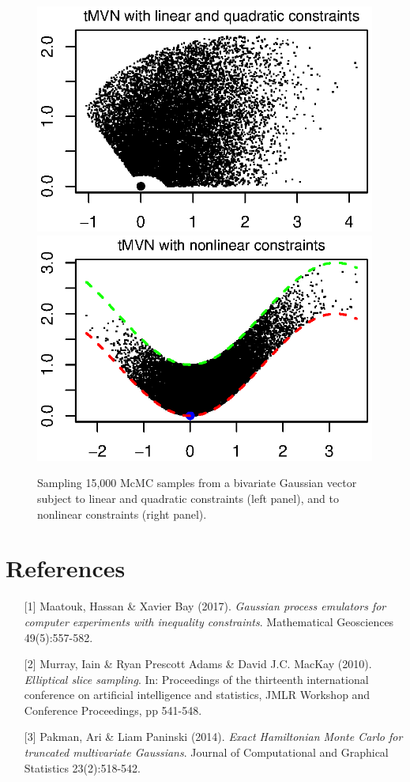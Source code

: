 \begin{talk}
\begin{figure}[ht]
\centering
\includegraphics[scale=0.76]{Photos/tmvn_linear_quadratic_constr}
\includegraphics[scale=0.76]{Photos/tmvn_nonlinear_constr}
\caption{Sampling 15,000 McMC samples from a bivariate Gaussian vector subject to linear and quadratic constraints (left panel), and to nonlinear constraints (right panel).}
\label{fig:tmvn}
\end{figure}





\section*{References}
\begin{enumerate}
	\item[{[1]}] Maatouk, Hassan \& Xavier Bay (2017). {\it Gaussian process emulators for computer experiments with inequality constraints}. Mathematical Geosciences 49(5):557-582.
	\item[{[2]}] Murray, Iain \& Ryan Prescott Adams \&  David J.C. MacKay (2010). {\it Elliptical slice sampling}. In: Proceedings of the thirteenth international conference on artificial intelligence and statistics, JMLR Workshop and Conference Proceedings, pp 541-548.
	\item[{[3]}] Pakman, Ari \& Liam Paninski (2014). {\it Exact Hamiltonian Monte Carlo for truncated multivariate Gaussians}. Journal of Computational and Graphical Statistics 23(2):518-542.
\end{enumerate}


\end{talk}
